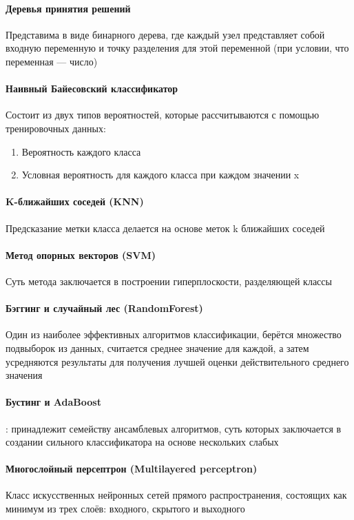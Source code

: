 \documentclass[times,specification,annotation]{itmo-student-thesis}
\begin{document}
	\paragraph{Деревья принятия решений} Представима в виде бинарного дерева, где каждый узел представляет собой входную переменную и точку разделения для этой переменной (при условии, что переменная — число)
	\paragraph{Наивный Байесовский классификатор} Состоит из двух типов вероятностей, которые рассчитываются с помощью тренировочных данных:
	\begin{enumerate} 
		\item Вероятность каждого класса
		\item Условная вероятность для каждого класса при каждом значении x
	\end{enumerate}
	\paragraph{K-ближайших соседей (KNN)} Предсказание метки класса делается на основе меток k ближайших соседей
	\paragraph{Метод опорных векторов (SVM)} Суть метода заключается в построении гиперплоскости, разделяющей классы
	\paragraph{Бэггинг и случайный лес (RandomForest)} Один из наиболее эффективных алгоритмов классификации, берётся множество подвыборок из данных, считается среднее значение для каждой, а затем усредняются результаты для получения лучшей оценки действительного среднего значения
	\paragraph{Бустинг и AdaBoost}: принадлежит семейству ансамблевых алгоритмов, суть которых заключается в создании сильного классификатора на основе нескольких слабых
	\paragraph{Многослойный персептрон (Multilayered perceptron)} Класс искусственных нейронных сетей прямого распространения, состоящих как минимум из трех слоёв: входного, скрытого и выходного 
\end{document}
